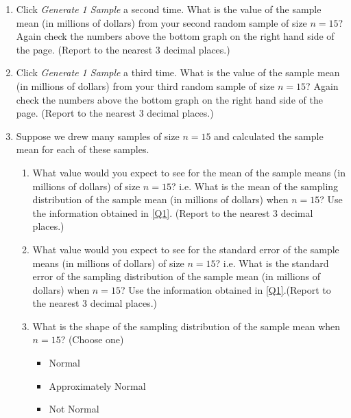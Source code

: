 \begin{enumerate}
\item Click \textit{Generate 1 Sample} a second time.  What is the value of the sample mean (in millions of dollars) from your second random sample of size $n=15$? Again check the numbers above the bottom graph on the right hand side of the page.  (Report to the nearest 3 decimal places.)\\

\item \label{samp3} Click \textit{Generate 1 Sample} a third time.  What is the value of the sample mean (in millions of dollars) from your third random sample of size $n=15$? Again check the numbers above the bottom graph on the right hand side of the page.   (Report to the nearest 3 decimal places.)\\

\item Suppose we drew many samples of size $n=15$ and calculated the sample mean for each of these samples.  
\begin{enumerate}
\item \label{n15mean} What value would you expect to see for the mean of the sample means (in millions of dollars) of size $n=15$? i.e. What is the mean of the sampling distribution of the sample mean  (in millions of dollars) when $n=15$? Use the information obtained in \ref{Q1}. (Report to the nearest 3 decimal places.)
\item \label{n15sd} What value would you expect to see for the standard error of the sample means (in millions of dollars) of size $n=15$? i.e. What is the standard error of the sampling distribution of the sample mean (in millions of dollars) when $n=15$? Use the information obtained in \ref{Q1}.(Report to the nearest 3 decimal places.)
\item  What is the shape of the sampling distribution of the sample mean when $n=15$?  (Choose one)
		\begin{itemize}
		\item  Normal
		\item Approximately Normal
		\item Not Normal\\
		\end{itemize}

\end{enumerate}



\end{enumerate}
